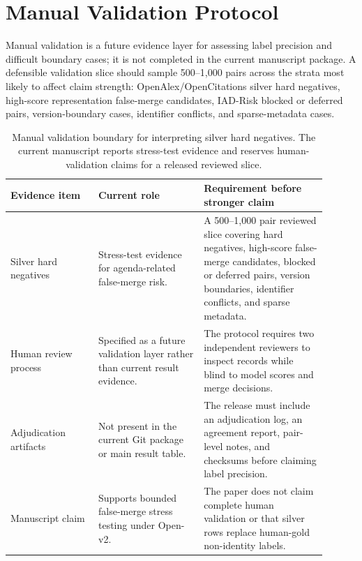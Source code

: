 \documentclass[11pt]{article}
\begin{document}
\section{Manual Validation Protocol}

Manual validation is a future evidence layer for assessing label precision and difficult boundary cases; it is not completed in the current manuscript package. A defensible validation slice should sample 500--1,000 pairs across the strata most likely to affect claim strength: OpenAlex/OpenCitations silver hard negatives, high-score representation false-merge candidates, IAD-Risk blocked or deferred pairs, version-boundary cases, identifier conflicts, and sparse-metadata cases.

\begin{table}[H]
\caption{Manual validation boundary for interpreting silver hard negatives. The current manuscript reports stress-test evidence and reserves human-validation claims for a released reviewed slice.}
\label{tab:manual-validation-boundary}
\centering
\footnotesize
\setlength{\tabcolsep}{3pt}
\begin{tabular}{L{0.25\linewidth}L{0.30\linewidth}L{0.35\linewidth}}
\toprule
Evidence item & Current role & Requirement before stronger claim \\
\midrule
Silver hard negatives & Stress-test evidence for agenda-related false-merge risk. & A 500--1,000 pair reviewed slice covering hard negatives, high-score false-merge candidates, blocked or deferred pairs, version boundaries, identifier conflicts, and sparse metadata. \\
Human review process & Specified as a future validation layer rather than current result evidence. & The protocol requires two independent reviewers to inspect records while blind to model scores and merge decisions. \\
Adjudication artifacts & Not present in the current Git package or main result table. & The release must include an adjudication log, an agreement report, pair-level notes, and checksums before claiming label precision. \\
Manuscript claim & Supports bounded false-merge stress testing under Open-v2. & The paper does not claim complete human validation or that silver rows replace human-gold non-identity labels. \\
\bottomrule
\end{tabular}
\end{table}
\end{document}
